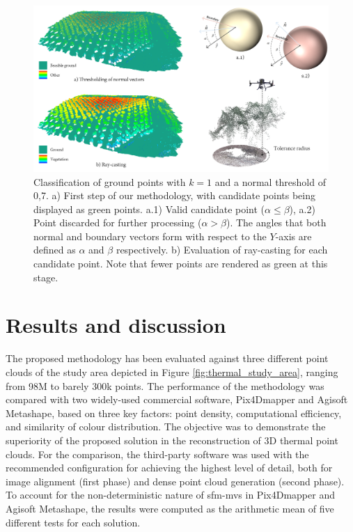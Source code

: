 \begin{figure}
    \centering
    \includegraphics{figs/thermal_projection/thermal_classification_result.png}
	\caption{Classification of ground points with $k = 1$ and a normal threshold of 0,7. a) First step of our methodology, with candidate points being displayed as green points. a.1) Valid candidate point ($\alpha \leq \beta$), a.2) Point discarded for further processing ($\alpha > \beta$). The angles that both normal and boundary vectors form with respect to the $Y$-axis are defined as $\alpha$ and $\beta$ respectively. b) Evaluation of ray-casting for each candidate point. Note that fewer points are rendered as green at this stage. }
	\label{fig:thermal_ground_classification}
\end{figure}

\section{Results and discussion}

The proposed methodology has been evaluated against three different point clouds of the study area depicted in Figure \ref{fig:thermal_study_area}, ranging from 98M to barely 300k points. The performance of the methodology was compared with two widely-used commercial software, Pix4Dmapper and Agisoft Metashape, based on three key factors: point density, computational efficiency, and similarity of colour distribution. The objective was to demonstrate the superiority of the proposed solution in the reconstruction of 3D thermal point clouds. For the comparison, the third-party software was used with the recommended configuration for achieving the highest level of detail, both for image alignment (first phase) and dense point cloud generation (second phase). To account for the non-deterministic nature of \acrshort{sfm}-\acrshort{mvs} in Pix4Dmapper and Agisoft Metashape, the results were computed as the arithmetic mean of five different tests for each solution.

